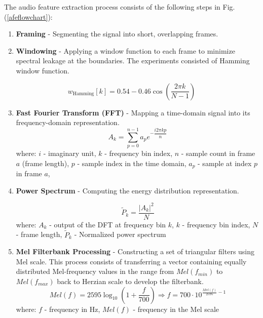 \documentclass[
onecolumn,
]{ceurart}
\begin{document}
	The audio feature extraction process consists of the following steps in Fig. (\ref{afeflowchart}):
	\begin{enumerate}[nosep]
		\item \textbf{Framing} - Segmenting the signal into short, overlapping frames.
		\item \textbf{Windowing} - Applying a window function to each frame to minimize spectral leakage at the boundaries. The experiments consisted of Hamming window function.
	\end{enumerate}
	\begin{equation}      w_{\text{Hamming}}[k]=0.54 - 0.46\cos{\left (\frac{2\pi k}{N-1}\right )}
	\end{equation}
	\begin{enumerate}[nosep]
		\setcounter{enumi}{2}
		\item \textbf{Fast Fourier Transform (FFT)} - Mapping a time-domain signal into its frequency-domain representation. 
		\begin{equation}
			A_k=\sum\limits_{p=0}^{n-1}a_pe^{-\dfrac{i2\pi kp}{n}}
		\end{equation}
		where: $i$ - imaginary unit, $k$ - frequency bin index, $n$ - sample count in frame $a$ (frame length), $p$ - sample index in the time domain, $a_p$ - sample at index $p$ in frame $a$, 
		\item \textbf{Power Spectrum} - Computing the energy distribution representation.
		
		\begin{equation}
			\tilde{P}_k = \frac{|A_k|^2}{N}
		\end{equation}
		where: $A_k$ - output of the DFT at frequency bin $k$, $k$ - frequency bin index, $N$ - frame length, $\tilde{P}_k$ - Normalized power spectrum
		\item \textbf{Mel Filterbank Processing} - Constructing a set of triangular filters using Mel scale. This process consists of transferring a vector containing equally distributed Mel-frequency values in the range from $Mel(f_{min})$ to $Mel(f_{max})$ back to Herzian scale to develop the filterbank.
		\begin{equation}
			Mel(f)=2595\log_{10}\left (1 + \frac{f}{700} \right ) \Rightarrow f=700\cdot10^{\frac{Mel(f)}{2595}-1}
		\end{equation}
		where: $f$ - frequency in Hz, $Mel(f)$ - frequency in the Mel scale
		

\end{enumerate}
\end{document}
